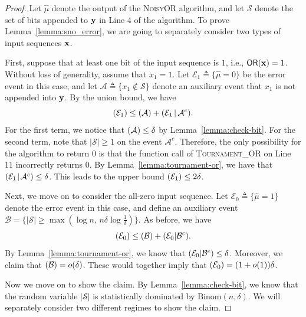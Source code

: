 \documentclass[journal, onecolumn]{IEEEtran}
\theoremstyle{plain}
\theoremstyle{definition}
\theoremstyle{remark}
\def\cs{{\mathcal S}}
\def\ce{{\mathcal E}}
\def\ca{{\mathcal A}}
\def\cb{{\mathcal B}}
\let\P\relax
\DeclareMathOperator\P{\mathsf{P}}
\newcommand{\cond}{\mathchoice{\,\vert\,}{\mspace{2mu}\vert\mspace{2mu}}{\vert}{\vert}}
\newcommand{\sno}{\textsc{NoisyOR }}
\newcommand{\stouror}{\textsc{Tournament\_OR }}
\begin{document}
\begin{proof}
    Let $\hat\mu$ denote the output of the \sno algorithm, and let $\cs$ denote the set of bits appended to ${\bf y}$ in Line 4 of the algorithm. To prove Lemma~\ref{lemma:sno_error}, we are going to separately consider two types of input sequences ${\bf x}$. 

    First, suppose that at least one bit of the input sequence is $1$, i.e., $\mathsf{OR}({\bf x})=1$. Without loss of generality, assume that $x_1=1$. Let $\mathcal{E}_1\triangleq\{\hat\mu=0\}$ be the error event in this case, and let $\mathcal{A}\triangleq\{x_1\notin \mathcal{S}\}$ denote an auxiliary event that $x_1$ is not appended into ${\bf y}$. By the union bound, we have 
    \begin{equation*}
        \P(\mathcal{E}_1) \le \P(\ca)+\P(\ce_1 \cond \ca^c).
    \end{equation*}
    For the first term, we notice that $\P(\ca)\le \delta$ by Lemma~\ref{lemma:check-bit}. For the second term, note that $|\mathcal{S}|\ge 1$ on the event $\ca^c$. Therefore, the only possibility for the algorithm to return $0$ is that the function call of \stouror on Line 11 incorrectly returns $0$. By Lemma~\ref{lemma:tournament-or}, we have that $\P(\ce_1 \cond \ca^c)\le \delta$. This leads to the upper bound $\P(\ce_1)\le 2\delta$.

    Next, we move on to consider the all-zero input sequence. Let $\ce_0\triangleq\{\hat\mu=1\}$ denote the error event in this case, and define an auxiliary event $\cb=\{|\mathcal{S}|\ge \max(\log n, \, n\delta\log\frac{1}{\delta})\}$. As before, we have
    \begin{equation*}
        \P(\mathcal{E}_0)\le \P(\cb)+\P(\ce_0|\cb^c).
    \end{equation*}
    By Lemma~\ref{lemma:tournament-or}, we know that $\P(\ce_0|\cb^c)\le \delta$. Moreover, we claim that $\P(\cb)=o(\delta)$. These would together imply that $\P(\ce_0)=(1+o(1))\delta$.

    Now we move on to show the claim. By Lemma~\ref{lemma:check-bit}, we know that the random variable $|\mathcal{S}|$ is statistically dominated by $\mathrm{Binom}(n,\delta)$. We will separately consider two different regimes to show the claim.


\end{proof}
\end{document}
